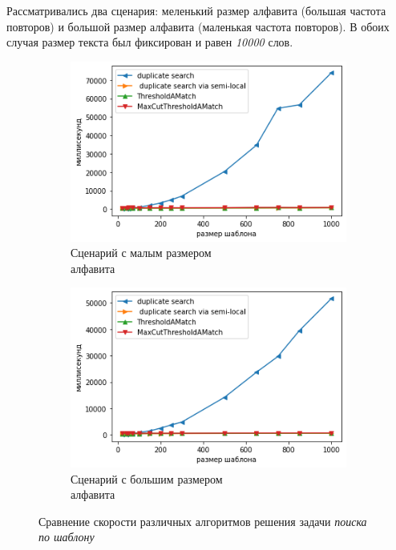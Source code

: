 Рассматривались два сценария: меленький размер алфавита (большая частота повторов) и большой размер алфавита (маленькая частота повторов).
В обоих случая размер текста был фиксирован и равен \emph{10000} слов.

\begin{figure}[h]
    \centering
    \begin{subfigure}[b]{0.45\textwidth}
    \centering
    \includegraphics[width=\textwidth]{figures/smallAlphabet.png} \caption{Сценарий с малым размером\\ алфавита}
    \label{fig:subim1}
    \end{subfigure}%
    \begin{subfigure}[b]{0.45\textwidth}
    \centering
    \includegraphics[width=\textwidth]{figures/largeAlphabet.png}
    \caption{Сценарий с большим размером\\ алфавита}
    \label{fig:subim2}
    \end{subfigure}
\caption{Сравнение скорости различных алгоритмов решения задачи \emph{поиска по шаблону}}\label{ssss}
\end{figure}

